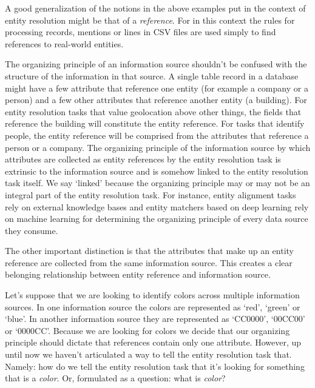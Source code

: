\documentclass[lettersize,journal]{IEEEtran}
\begin{document}
    A good generalization of the notions in the above examples put in the
    context of entity resolution might be that of a
    \textit{reference}\cite{Ben2009Swoosh}.
    For in this context the rules for processing records, mentions or lines in
    CSV files are used simply to find references to real-world entities.

    The organizing principle of an information source shouldn't be confused with
    the structure of the information in that source.
    A single table record in a database might have a few attribute that
    reference one entity (for example a company or a person) and a few other
    attributes that reference another entity (a building).
    For entity resolution tasks that value geolocation above other things, the 
    fields that reference the building will constitute the entity reference.
    For tasks that identify people, the entity reference will be comprised from
    the attributes that reference a person or a company.
    The organizing principle of the information source by which attributes are
    collected as entity references by the entity resolution task is extrinsic to
    the information source and is somehow linked to the entity resolution task
    itself.
    We say `linked' because the organizing principle may or may not be an
    integral part of the entity resolution task.
    For instance, entity alignment tasks rely on external knowledge bases and
    entity matchers based on deep learning rely on machine learning for
    determining the organizing principle of every data source they consume.

    The other important distinction is that the attributes that make up an
    entity reference are collected from the same information source.
    This creates a clear belonging relationship between entity reference and
    information source.
    
    Let's suppose that we are looking to identify colors across multiple
    information sources.
    In one information source the colors are represented as `red', `green' or 
    `blue'.
    In another information source they are represented as `CC0000', `00CC00' or
    `0000CC'.
    Because we are looking for colors we decide that our organizing principle
    should dictate that references contain only one attribute.
    However, up until now we haven't articulated a way to tell the entity
    resolution task that.
    Namely: how do we tell the entity resolution task that it's looking for
    something that is a \textit{color}.
    Or, formulated as a question: what is \textit{color}?
\end{document}
